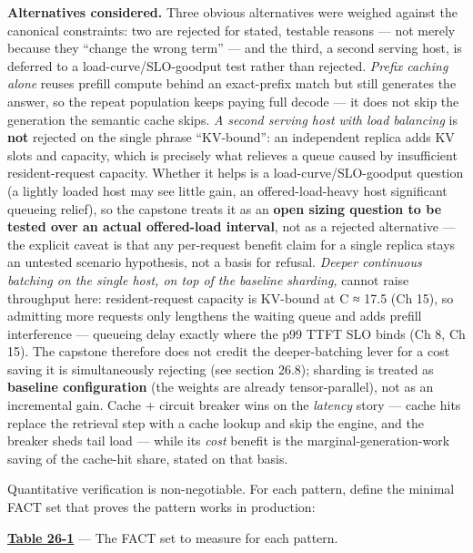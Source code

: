 \textbf{Alternatives considered.} Three obvious alternatives were
weighed against the canonical constraints: two are rejected for stated,
testable reasons --- not merely because they ``change the wrong term''
--- and the third, a second serving host, is deferred to a
load-curve/SLO-goodput test rather than rejected. \emph{Prefix caching
alone} reuses prefill compute behind an exact-prefix match but still
generates the answer, so the repeat population keeps paying full decode
--- it does not skip the generation the semantic cache skips. \emph{A
second serving host with load balancing} is \textbf{not} rejected on the
single phrase ``KV-bound'': an independent replica adds KV slots and
capacity, which is precisely what relieves a queue caused by
insufficient resident-request capacity. Whether it helps is a
load-curve/SLO-goodput question (a lightly loaded host may see little
gain, an offered-load-heavy host significant queueing relief), so the
capstone treats it as an \textbf{open sizing question to be tested over
an actual offered-load interval}, not as a rejected alternative --- the
explicit caveat is that any per-request benefit claim for a single
replica stays an untested scenario hypothesis, not a basis for refusal.
\emph{Deeper continuous batching on the single host, on top of the
baseline sharding,} cannot raise throughput here: resident-request
capacity is KV-bound at C ≈ 17.5 (Ch 15), so admitting more requests
only lengthens the waiting queue and adds prefill interference ---
queueing delay exactly where the p99 TTFT SLO binds (Ch 8, Ch 15). The
capstone therefore does not credit the deeper-batching lever for a cost
saving it is simultaneously rejecting (see section 26.8); sharding is
treated as \textbf{baseline configuration} (the weights are already
tensor-parallel), not as an incremental gain. Cache + circuit breaker
wins on the \emph{latency} story --- cache hits replace the retrieval
step with a cache lookup and skip the engine, and the breaker sheds tail
load --- while its \emph{cost} benefit is the marginal-generation-work
saving of the cache-hit share, stated on that basis.

\label{measurement}


Quantitative verification is non-negotiable. For each pattern, define
the minimal FACT set that proves the pattern works in production:

\textbf{\hyperref[tab:26.1]{Table 26-1}} --- The FACT set to measure for each pattern.

